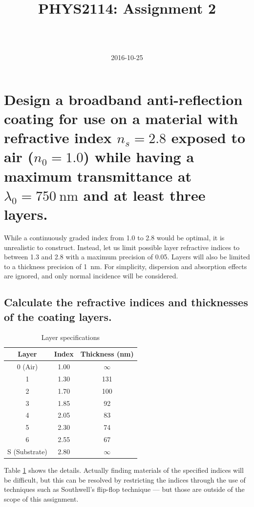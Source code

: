 \documentclass[a4paper]{scrartcl}
\begin{document}
\title{PHYS2114: Assignment 2}
\author{ \\ \\ }
\date{2016-10-25}
\maketitle

\section{Design a broadband anti-reflection coating for use on a material with refractive index \(n_s = 2.8\) exposed to air (\(n_0 = 1.0\)) while having a maximum transmittance at \(\lambda_0 = \SI{750}{\nano\metre}\) and at least three layers.}

While a continuously graded index from 1.0 to 2.8 would be optimal, it is unrealistic to construct. Instead, let us limit possible layer refractive indices to between 1.3 and 2.8 with a maximum precision of 0.05. Layers will also be limited to a thickness precision of \SI{1}{\nano\metre}. For simplicity, dispersion and absorption effects are ignored, and only normal incidence will be considered.

\subsection{Calculate the refractive indices and thicknesses of the coating layers.}
\begin{table}
    \centering
    \begin{tabular}{c | c | c}
        Layer & Index & Thickness (\si{\nano\metre}) \\
        \hline
        0 (Air) & 1.00 & \(\infty\) \\
        1 & 1.30 & 131 \\
        2 & 1.70 & 100 \\
        3 & 1.85 & 92 \\
        4 & 2.05 & 83 \\
        5 & 2.30 & 74 \\
        6 & 2.55 & 67 \\
        S (Substrate) & 2.80 & \(\infty\)
    \end{tabular}
    \caption{Layer specifications}
    \label{tab:layers}
\end{table}

Table \ref{tab:layers} shows the details. Actually finding materials of the specified indices will be difficult, but this can be resolved by restricting the indices through the use of techniques such as Southwell's flip-flop technique --- but those are outside of the scope of this assignment.
\end{document}
